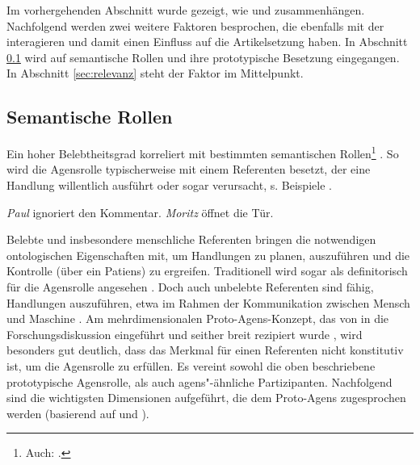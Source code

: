 Im vorhergehenden Abschnitt wurde gezeigt, wie  und  zusammenhängen. Nachfolgend werden zwei weitere Faktoren besprochen, die ebenfalls mit der  interagieren und damit einen Einfluss auf die Artikelsetzung haben. In Abschnitt \ref{sec:partizipanten} wird auf semantische Rollen  und ihre prototypische Besetzung eingegangen. In Abschnitt \ref{sec:relevanz} steht der Faktor  im Mittelpunkt.
 
\subsection{Semantische Rollen}\label{sec:partizipanten}

Ein hoher Belebtheitsgrad  korreliert mit bestimmten  semantischen Rollen\footnote{Auch:  \parencite[vgl.][]{Lehmann2004a}.} \parencite[vgl. u.a.][]{Hopper1980,Comrie1989,Yamamoto2006}. So wird die Agensrolle  typischerweise mit einem Referenten besetzt, der eine Handlung willentlich ausführt oder sogar verursacht, s. Beispiele .

\begin{exe}
	\ex \label{ex:agens}
	\begin{xlist}
		\ex \label{ex:voll} \textit{Paul} ignoriert den Kommentar. 
 		\ex \label{ex:verursacher} \textit{Moritz} öffnet die Tür.
	\end{xlist}
\end{exe}

\noindent 
Belebte  und insbesondere menschliche Referenten bringen die notwendigen ontologischen Eigenschaften mit, um Handlungen zu planen,  auszuführen und die Kontrolle (über ein Patiens) zu ergreifen. Traditionell wird  sogar als definitorisch für die Agensrolle  angesehen \parencite[16]{Primus2012}. 
Doch auch unbelebte  Referenten sind fähig, Handlungen auszuführen, etwa im Rahmen der  Kommunikation zwischen Mensch und Maschine \parencite[s. weiterführend][18]{Primus2012}. Am mehrdimensionalen  Proto-Agens-Konzept, das von \textcite{Dowty1991} in die Forschungsdiskussion eingeführt und seither breit rezipiert wurde \parencite[vgl. u.a.][]{Ackermann2001,Primus2012,Szczepaniak2016}, wird besonders gut deutlich, dass das Merkmal  für einen Referenten nicht konstitutiv ist, um die Agensrolle  zu erfüllen. Es vereint sowohl die oben beschriebene prototypische  Agensrolle, als auch agens"-ähnliche  Partizipanten. Nachfolgend sind die wichtigsten Dimensionen aufgeführt, die dem Proto-Agens  zugesprochen werden  (basierend auf \citealt[572--573]{Dowty1991} und \citealt[25]{Primus2012}).  

